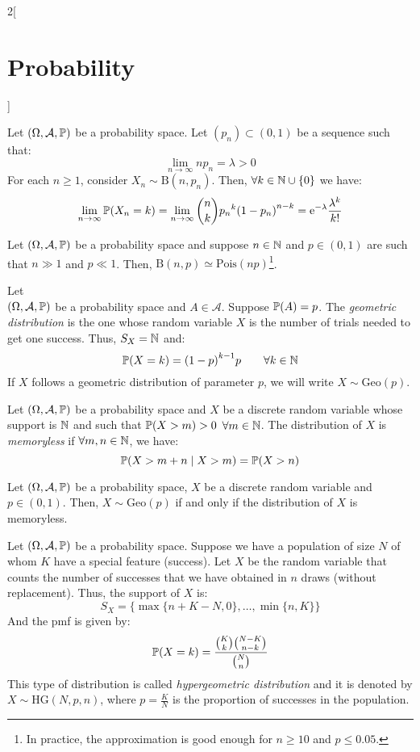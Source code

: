 \documentclass[../../../main.tex]{subfiles}
\begin{document}
\begin{multicols}{2}[\section{Probability}]
\begin{definition}
  \end{definition}
  \begin{theorem}
    Let $(\Omega,\mathcal{A},\mathbb{P})$ be a probability space. Let $(p_n)\subset(0,1)$ be a sequence such that: $$\lim_{n\to\infty}np_n=\lambda>0$$
    For each $n\geq 1$, consider $X_n\sim \text{B}(n,p_n)$. Then, $\forall k\in\mathbb{N}\cup\{0\}$ we have: $$\lim_{n\to\infty}\mathbb{P}(X_n=k)=\lim_{n\to\infty}\binom{n}{k}{p_n}^k{(1-p_n)}^{n-k}=\mathrm{e}^{-\lambda}\frac{\lambda^k}{k!}$$
  \end{theorem}
  \begin{corollary}
    Let $(\Omega,\mathcal{A},\mathbb{P})$ be a probability space and suppose $n\in\mathbb{N}$ and $p\in (0,1)$ are such that $n\gg 1$ and $p\ll 1$. Then, $\text{B}(n,p)\simeq\text{Pois}(np)$\footnote{In practice, the approximation is good enough for $n\geq 10$ and $p\leq 0.05$.}.
  \end{corollary}
  \begin{definition}
    Let\\ $(\Omega,\mathcal{A},\mathbb{P})$ be a probability space and $A\in\mathcal{A}$. Suppose $\mathbb{P}(A)=p$. The \emph{geometric distribution} is the one whose random variable $X$ is the number of trials needed to get one success. Thus, $S_X=\mathbb{N}$ and: $$\mathbb{P}(X=k)={(1-p)}^{k-1}p\qquad \forall k\in\mathbb{N}$$ If $X$ follows a geometric distribution of parameter $p$, we will write $X\sim \text{Geo}(p)$.
  \end{definition}
  \begin{definition}
    Let $(\Omega,\mathcal{A},\mathbb{P})$ be a probability space and $X$ be a discrete random variable whose support is $\mathbb{N}$ and such that $\mathbb{P}(X >m)>0$ $\forall m\in\mathbb{N}$. The distribution of $X$ is \emph{memoryless} if $\forall m,n\in\mathbb{N}$, we have: $$\mathbb{P}(X>m+n\mid X >m)=\mathbb{P}(X>n)$$
  \end{definition}
  \begin{proposition}
    Let $(\Omega,\mathcal{A},\mathbb{P})$ be a probability space, $X$ be a discrete random variable and $p\in(0,1)$. Then, $X\sim\text{Geo}(p)$ if and only if the distribution of $X$ is memoryless.
  \end{proposition}
  \begin{definition}
    Let $(\Omega,\mathcal{A},\mathbb{P})$ be a probability space. Suppose we have a population of size $N$ of whom $K$ have a special feature (success). Let $X$ be the random variable that counts the number of successes that we have obtained in $n$ draws (without replacement). Thus, the support of $X$ is: $$S_X=\{\max\{n+K-N,0\},\ldots,\min\{n,K\}\}$$ And the pmf is given by: $$\mathbb{P}(X=k)=\frac{\binom{K}{k}\binom{N-K}{n-k}}{\binom{N}{n}}$$ This type of distribution is called \emph{hypergeometric distribution} and it is denoted by $X\sim \text{HG}(N,p,n)$, where $p=\frac{K}{N}$ is the proportion of successes in the population.

\end{definition}
\end{multicols}
\end{document}
